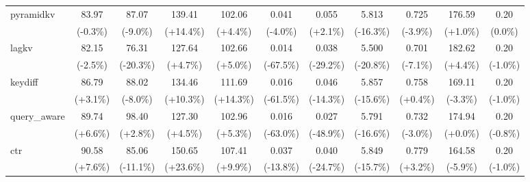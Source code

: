\begin{table}[t]
{\begin{tabular}{l|cccccccccc}
    pyramidkv & 83.97 & 87.07 & 139.41 & 102.06 & 0.041 & 0.055 & 5.813 & 0.725 & 176.59 & 0.20 \\
     & {\tiny\color{green!60!black}(-0.3\%)} & {\tiny\color{green!60!black}(-9.0\%)} & {\tiny\color{red!70!black}(+14.4\%)} & {\tiny\color{red!70!black}(+4.4\%)} & {\tiny\color{green!60!black}(-4.0\%)} & {\tiny\color{red!70!black}(+2.1\%)} & {\tiny\color{green!60!black}(-16.3\%)} & {\tiny\color{green!60!black}(-3.9\%)} & {\tiny\color{green!60!black}(+1.0\%)} & {\tiny\color{gray}(0.0\%)} \\
    lagkv & 82.15 & 76.31 & 127.64 & 102.66 & 0.014 & 0.038 & 5.500 & 0.701 & 182.62 & 0.20 \\
     & {\tiny\color{green!60!black}(-2.5\%)} & {\tiny\color{green!60!black}(-20.3\%)} & {\tiny\color{red!70!black}(+4.7\%)} & {\tiny\color{red!70!black}(+5.0\%)} & {\tiny\color{green!60!black}(-67.5\%)} & {\tiny\color{green!60!black}(-29.2\%)} & {\tiny\color{green!60!black}(-20.8\%)} & {\tiny\color{green!60!black}(-7.1\%)} & {\tiny\color{green!60!black}(+4.4\%)} & {\tiny\color{green!60!black}(-1.0\%)} \\
    keydiff & 86.79 & 88.02 & 134.46 & 111.69 & 0.016 & 0.046 & 5.857 & 0.758 & 169.11 & 0.20 \\
     & {\tiny\color{red!70!black}(+3.1\%)} & {\tiny\color{green!60!black}(-8.0\%)} & {\tiny\color{red!70!black}(+10.3\%)} & {\tiny\color{red!70!black}(+14.3\%)} & {\tiny\color{green!60!black}(-61.5\%)} & {\tiny\color{green!60!black}(-14.3\%)} & {\tiny\color{green!60!black}(-15.6\%)} & {\tiny\color{red!70!black}(+0.4\%)} & {\tiny\color{red!70!black}(-3.3\%)} & {\tiny\color{green!60!black}(-1.0\%)} \\
    query\_aware & 89.74 & 98.40 & 127.30 & 102.96 & 0.016 & 0.027 & 5.791 & 0.732 & 174.94 & 0.20 \\
     & {\tiny\color{red!70!black}(+6.6\%)} & {\tiny\color{red!70!black}(+2.8\%)} & {\tiny\color{red!70!black}(+4.5\%)} & {\tiny\color{red!70!black}(+5.3\%)} & {\tiny\color{green!60!black}(-63.0\%)} & {\tiny\color{green!60!black}(-48.9\%)} & {\tiny\color{green!60!black}(-16.6\%)} & {\tiny\color{green!60!black}(-3.0\%)} & {\tiny\color{green!60!black}(+0.0\%)} & {\tiny\color{green!60!black}(-0.8\%)} \\
    ctr & 90.58 & 85.06 & 150.65 & 107.41 & 0.037 & 0.040 & 5.849 & 0.779 & 164.58 & 0.20 \\
     & {\tiny\color{red!70!black}(+7.6\%)} & {\tiny\color{green!60!black}(-11.1\%)} & {\tiny\color{red!70!black}(+23.6\%)} & {\tiny\color{red!70!black}(+9.9\%)} & {\tiny\color{green!60!black}(-13.8\%)} & {\tiny\color{green!60!black}(-24.7\%)} & {\tiny\color{green!60!black}(-15.7\%)} & {\tiny\color{red!70!black}(+3.2\%)} & {\tiny\color{red!70!black}(-5.9\%)} & {\tiny\color{green!60!black}(-1.0\%)} \\

\end{tabular}}
\end{table}
